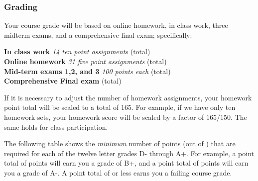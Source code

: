 \documentclass[12pt]{article}
\newcounter{on}\setcounter{on}{0}
\newcounter{ex}\setcounter{ex}{0}
\newenvironment{mypar}[2]
  {\begin{list}{}%
    {\setlength\leftmargin{#1}
    \setlength\rightmargin{#2}}
    \item[]}
  {\end{list}}
\begin{document}
\subsubsection*{Grading}

Your course grade will be based on online homework, in class work,
three midterm exams, and a comprehensive final exam; specifically:
\begin{mypar}{0.25in}{0.25in}
    \textbf{In class work}  \emph{14 ten point assignments}   (total) \\
    \textbf{Online homework} \emph{31 five point assignments} (total) \\
    \textbf{Mid-term exams 1,2, and 3} \emph{100 points each}  (total)\\
    \textbf{Comprehensive Final exam}  (total)
\end{mypar}
If it is necessary to adjust the number of  homework assignments,  your homework point 
total will be scaled to a total of 165.  For example, if we have only ten homework sets, 
your homework score will be scaled by a factor of \(165/150\). The same holds
for class participation.





The following table shows the \emph{minimum} number of points (out of \points) that
are required for each of the twelve letter grades D- through A+. For
example, a point total of \Bp\/  points will earn you a grade of B+,  and 
a point total of \Am\/ points will earn you a grade of A-. A point
total of \F\/  or less earns you a failing course grade.
 
\end{document}
